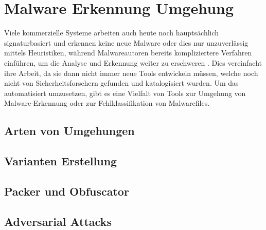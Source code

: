 \section{Malware Erkennung Umgehung}
\label{Sec:MalwareEvasion}
Viele kommerzielle Systeme arbeiten auch heute noch hauptsächlich signaturbasiert und erkennen keine neue Malware oder dies nur unzuverlässig mittels Heuristiken\cite{rathore_2023_breaking}, während Malwareautoren bereits kompliziertere Verfahren einführen, um die Analyse und Erkennung weiter zu erschweren \cite{nunes_2022_bane}. Dies vereinfacht ihre Arbeit, da sie dann nicht immer neue Tools entwickeln müssen, welche noch nicht von Sicherheitsforschern gefunden und katalogisiert wurden\cite{holm_2023_hide}. Um das automatisiert umzusetzen, gibt es eine Vielfalt von Tools zur Umgehung von Malware-Erkennung oder zur Fehlklassifikation von Malwarefiles.

\subsection{Arten von Umgehungen}
\subsection{Varianten Erstellung}
\subsection{Packer und Obfuscator}
\subsection{Adversarial Attacks}
